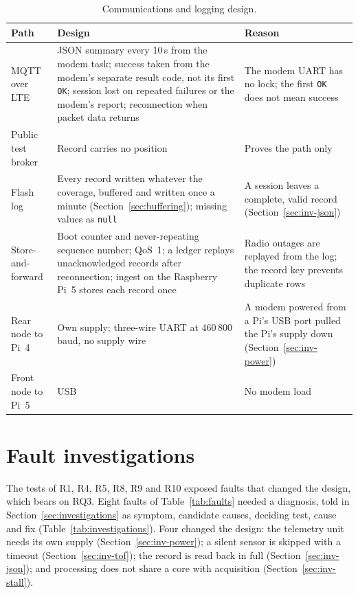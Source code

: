 \begin{table}[htbp]
\centering
\small
\caption[Communications and logging design]{Communications and logging design.}
\label{tab:comms-design}
\begin{tabular}{|p{2.6cm}|p{7.6cm}|p{4.0cm}|}
\hline
\textbf{Path} & \textbf{Design} & \textbf{Reason} \\ \hline
MQTT over LTE & JSON summary every 10\,s from the modem task; success taken from the modem's separate result code, not its first \texttt{OK}; session lost on repeated failures or the modem's report; reconnection when packet data returns & The modem UART has no lock; the first \texttt{OK} does not mean success \\ \hline
Public test broker & Record carries no position & Proves the path only \\ \hline
Flash log & Every record written whatever the coverage, buffered and written once a minute (Section~\ref{sec:buffering}); missing values as \texttt{null} & A session leaves a complete, valid record (Section~\ref{sec:inv-json}) \\ \hline
Store-and-forward & Boot counter and never-repeating sequence number; QoS~1; a ledger replays unacknowledged records after reconnection; ingest on the Raspberry Pi~5 stores each record once & Radio outages are replayed from the log; the record key prevents duplicate rows \\ \hline
Rear node to Pi~4 & Own supply; three-wire UART at 460\,800\,baud, no supply wire & A modem powered from a Pi's USB port pulled the Pi's supply down (Section~\ref{sec:inv-power}) \\ \hline
Front node to Pi~5 & USB & No modem load \\ \hline
\end{tabular}
\end{table}

\section{Fault investigations}
\label{sec:faults-summary}

The tests of R1, R4, R5, R8, R9 and R10 exposed faults that changed the design, which bears on RQ3. Eight faults of Table~\ref{tab:faults} needed a diagnosis, told in Section~\ref{sec:investigations} as symptom, candidate causes, deciding test, cause and fix (Table~\ref{tab:investigations}). Four changed the design: the telemetry unit needs its own supply (Section~\ref{sec:inv-power}); a silent sensor is skipped with a timeout (Section~\ref{sec:inv-tof}); the record is read back in full (Section~\ref{sec:inv-json}); and processing does not share a core with acquisition (Section~\ref{sec:inv-stall}).

